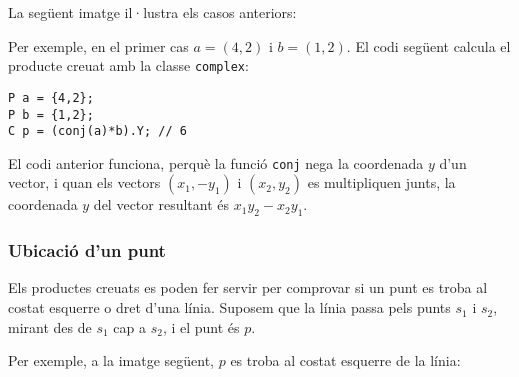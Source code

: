 La següent imatge il·lustra els casos anteriors:
\begin{center}
\end{center}


\noindent Per exemple, en el primer cas $a=(4,2)$ i $b=(1,2)$. El codi
següent calcula el producte creuat amb la classe \texttt{complex}:


\begin{lstlisting}
P a = {4,2};
P b = {1,2};
C p = (conj(a)*b).Y; // 6
\end{lstlisting}


El codi anterior funciona, perquè la funció \texttt{conj} nega la
coordenada $y$ d'un vector, i quan els vectors $(x_1,-y_1)$ i
$(x_2,y_2)$ es multipliquen junts, la coordenada $y$ del vector
resultant és $x_1 y_2 - x_2 y_1$.

\subsubsection{Ubicació d'un punt}

Els productes creuats es poden fer servir per comprovar si un punt es
troba al costat esquerre o dret d'una línia. Suposem que la línia
passa pels punts $s_1$ i $s_2$, mirant des de $s_1$ cap a $s_2$, i el
punt és $p$.

Per exemple, a la imatge següent, $p$ es troba al costat esquerre de
la línia:
\begin{center}
\end{center}


